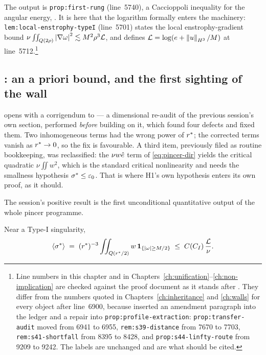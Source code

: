 The output is \texttt{prop:first-rung} (line~5740), a Caccioppoli inequality
for the angular energy, . It is here
that the logarithm formally enters the machinery: \texttt{lem:local-enstrophy-typeI}
(line~5701) states the local enstrophy-gradient bound
\(\nu\iint_{Q(2\rho)}\left|\nabla\omega\right|^2\lesssim M^2\rho^3\mathcal{L}\), and defines
\(\mathcal{L}=\log(e+\left\|u\right\|_{H^3}/M)\) at line~5712.\footnote{Line numbers in this
chapter and in Chapters~\ref{ch:unification}--\ref{ch:non-implication} are
checked against the proof document as it stands after . They differ
from the numbers quoted in Chapters~\ref{ch:inheritance} and \ref{ch:walls}
for every object after line~6900, because  inserted an amendment
paragraph into the  ledger and a repair into
\texttt{prop:profile-extraction}: \texttt{prop:transfer-audit} moved from
6941 to 6955, \texttt{rem:s39-distance} from 7670 to 7703,
\texttt{rem:s41-shortfall} from 8395 to 8428, and
\texttt{prop:s44-linfty-route} from 9209 to 9242. The labels are unchanged and
are what should be cited.}

\subsection{\texorpdfstring{: an a priori bound, and the first sighting of the wall}{S34: an a priori bound, and the first sighting of the wall}}

 opens with a corrigendum to  --- a dimensional re-audit of the
previous session's own section, performed \emph{before} building on it, which
found four defects and fixed them. Two inhomogeneous terms had the wrong power
of \(r^{*}\); the corrected terms vanish as \(r^{*}\to0\), so the fix is
favourable. A third item, previously filed as routine bookkeeping, was
reclassified: the \(\nu w\hat{e}\) term of \eqref{eq:pincer-dir} yields the
critical quadratic \(\nu\iint w^2\), which is the standard critical
nonlinearity and needs the smallness hypothesis \(\sigma^{*}\le\varepsilon_0\).
That is where H1's own hypothesis enters its own proof, as it should.

The session's positive result is the first unconditional quantitative output
of the whole pincer programme.

\begin{statement}
\label{st:apriori}
\PROVED{} Near a Type-I singularity,
\[
  \langle\sigma^{*}\rangle
  \;=\; (r^{*})^{-3}\iint_{Q(r^{*}/2)} w\,\mathbf 1_{\{\left|\omega\right|\ge M/2\}}
  \;\le\; C(C_I)\,\frac{\mathcal{L}}{\nu}.
\]
\end{statement}

